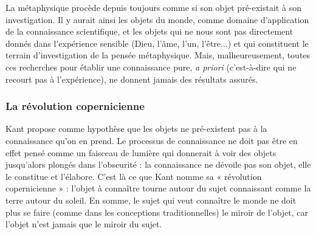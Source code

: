 La métaphysique procède depuis toujours comme si son objet pré-existait à son
investigation. Il y aurait ainsi les objets du monde, comme domaine d’application
de la connaissance scientifique, et les objets qui ne nous sont pas directement
donnés dans l'expérience sensible (Dieu, l'âme, l’un, l'être...) et qui constituent le
terrain d'investigation de la pensée métaphysique. Mais, malheureusement, toutes
ces recherches pour établir une connaissance pure, {\it a priori} (c'est-à-dire qui ne
recourt pas à l'expérience), ne donnent jamais des résultats assurés.

\subsubsection{La révolution copernicienne}

Kant propose comme hypothèse que les objets ne pré-existent pas à la connaissance
qu’on en prend. Le processus de connaissance ne doit pas être en effet
pensé comme un faisceau de lumière qui donnerait à voir des objets jusqu'alors
plongés dans l'obscurité : la connaissance ne dévoile pas son objet, elle le constitue
et l’élabore. C'est là ce que Kant nomme sa « révolution copernicienne » :
l'objet à connaître tourne autour du sujet connaissant comme la terre autour du
soleil. En somme, le sujet qui veut connaître le monde ne doit plus se faire
(comme dans les conceptions traditionnelles) le miroir de l’objet, car l’objet n’est
jamais que le miroir du sujet.

